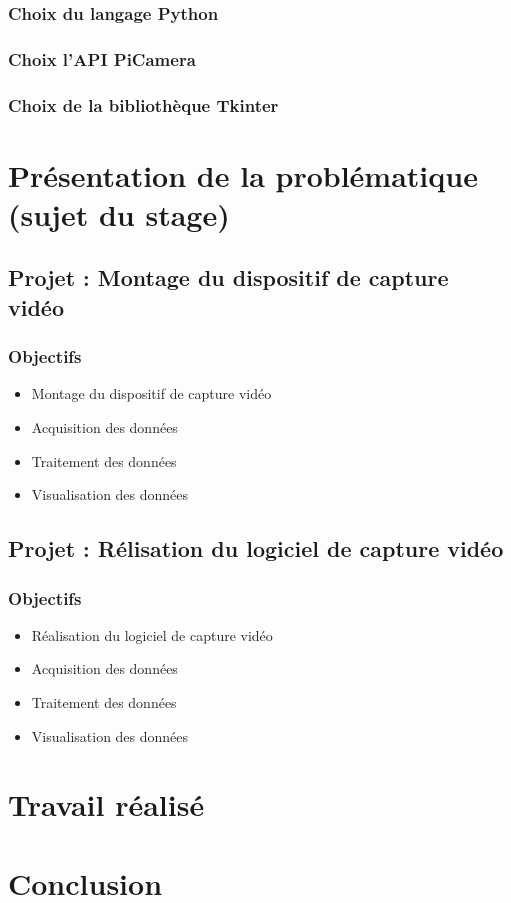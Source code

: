 \documentclass[a4paper, 11pt]{report}
\begin{document}
        \subsection{Choix du langage Python}
        \subsection{Choix l'API PiCamera}
        \subsection{Choix de la bibliothèque Tkinter}

\chapter{Présentation de la problématique (sujet du stage)}
\minitoc
    \section{Projet : Montage du dispositif de capture vidéo}
      
        \subsection{Objectifs}
            \begin{itemize}
                \item Montage du dispositif de capture vidéo
                \item Acquisition des données
                \item Traitement des données
                \item Visualisation des données
            \end{itemize}
    

    \section{Projet : Rélisation du logiciel de capture vidéo}
        \subsection{Objectifs}
            \begin{itemize}
                \item Réalisation du logiciel de capture vidéo
                \item Acquisition des données
                \item Traitement des données
                \item Visualisation des données
            \end{itemize}

\chapter{Travail réalisé}
\minitoc      

\chapter{Conclusion}
\minitoc      
\end{document}

